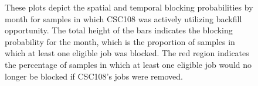 \begin{figure}
  \caption{These plots depict the spatial and temporal blocking probabilities
by month for samples in which CSC108 was actively utilizing backfill
opportunity. The total height of the bars indicates the blocking probability
for the month, which is the proportion of samples in which at least one
eligible job was blocked. The red region indicates the percentage of samples in
which at least one eligible job would no longer be blocked if CSC108's jobs
were removed.}
\end{figure}


